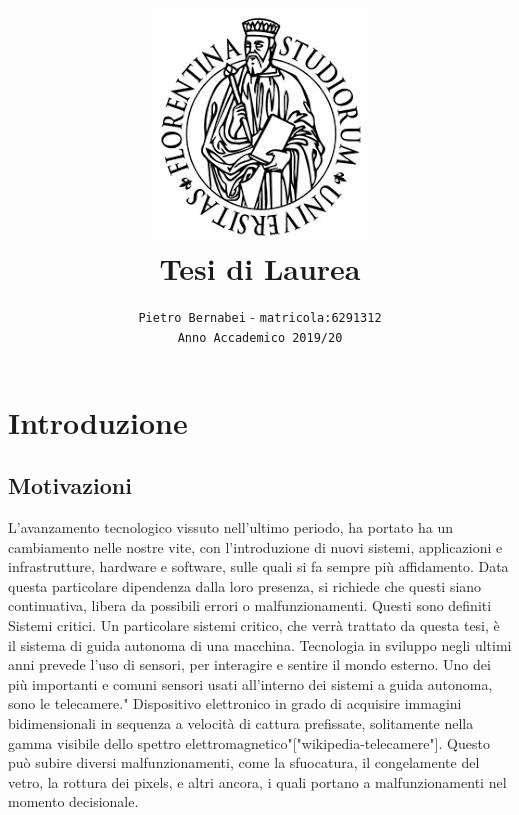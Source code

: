 \documentclass[14pt]{extarticle}
\begin{document}
\title{\includegraphics{download.jpeg} \vspace{2cm} \textbf{\\Tesi di Laurea}}

\author{\texttt{Pietro Bernabei} - \texttt{matricola:6291312}\\ \texttt{Anno Accademico 2019/20}}
\date{}
\maketitle

\newpage
\section{Introduzione}
\subsection{Motivazioni}
L'avanzamento tecnologico vissuto nell'ultimo periodo,  ha portato ha un cambiamento nelle nostre vite, con l'introduzione di nuovi sistemi, applicazioni e infrastrutture, hardware e software, sulle quali si fa sempre più affidamento.
Data questa particolare dipendenza dalla loro presenza, si richiede che questi siano continuativa, libera da possibili errori o malfunzionamenti. Questi sono definiti Sistemi critici.
Un particolare sistemi critico, che verrà trattato da questa tesi, è il sistema di guida autonoma di una macchina.
Tecnologia in sviluppo negli ultimi anni prevede l'uso di sensori, per interagire e sentire il mondo esterno. Uno dei più importanti e comuni sensori usati all'interno dei sistemi a guida autonoma, sono le telecamere." Dispositivo elettronico in grado di acquisire immagini bidimensionali in sequenza a velocità di cattura prefissate, solitamente nella gamma visibile dello spettro elettromagnetico"["wikipedia-telecamere"]. Questo può subire diversi malfunzionamenti, come la sfuocatura, il congelamente del vetro, la rottura dei pixels, e altri ancora, i quali portano a malfunzionamenti nel momento decisionale.
\end{document}
